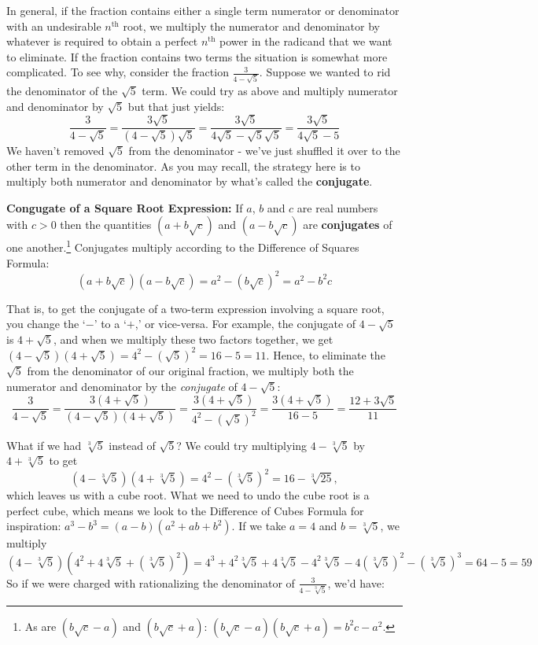 \documentclass[10pt]{article}
\begin{document}
 In general, if the fraction contains either a single term numerator or denominator with an undesirable $n^{\text{th}}$ root, we multiply the numerator and denominator by whatever is required to obtain a perfect $n^{\text{th}}$ power in the radicand that we want to eliminate. If the fraction contains two terms the situation is somewhat more complicated.  To see why, consider the fraction $\frac{3}{4 - \sqrt{5}}$.  Suppose we wanted to rid the denominator of the $\sqrt{5}$ term.  We could try as above and multiply numerator and denominator by $\sqrt{5}$ but that just yields: \[ \dfrac{3}{4 - \sqrt{5}} = \dfrac{3\sqrt{5}}{(4 - \sqrt{5})\sqrt{5}} = \dfrac{3\sqrt{5}}{4\sqrt{5} - \sqrt{5}\sqrt{5}} = \dfrac{3\sqrt{5}}{4\sqrt{5} - 5}\] We haven't removed $\sqrt{5}$ from the denominator - we've just shuffled it over to the other term in the denominator.  As you may recall, the strategy here is to multiply both numerator and denominator by what's called the \textbf{conjugate}.  

\medskip

\colorbox{ResultColor}{\bbm

\begin{defn}\label{squarerootconj} \textbf{Congugate of a Square Root Expression:}  If $a$, $b$ and $c$ are real numbers with $c > 0$ then the quantities $(a + b \sqrt{c})$ and $(a - b\sqrt{c})$ are \textbf{conjugates} of one another.\footnote{As are $(b\sqrt{c} -a)$ and $(b\sqrt{c} + a)$: $(b\sqrt{c} -a)(b\sqrt{c} + a) = b^2c - a^2$.}  Conjugates multiply according to the Difference of Squares Formula:  \[ (a + b \sqrt{c})(a - b\sqrt{c}) = a^2 - (b \sqrt{c})^2 = a^2 - b^2c\]
\end{defn}
\ebm}

\medskip

That is, to get the conjugate of a two-term expression involving a square root, you change the `$-$' to a `$+$,' or vice-versa.  For example, the conjugate of $4 - \sqrt{5}$ is $4 + \sqrt{5}$, and when we multiply these two factors together, we get $(4 - \sqrt{5})(4 + \sqrt{5}) = 4^2 - (\sqrt{5})^2 = 16 - 5 = 11$.  Hence, to eliminate the $\sqrt{5}$ from the denominator of our original fraction, we multiply both the numerator and denominator by the \textit{conjugate} of $4-\sqrt{5}$: \[\dfrac{3}{4 - \sqrt{5}} = \dfrac{3 (4 + \sqrt{5})}{(4 - \sqrt{5})(4 + \sqrt{5})} = \dfrac{3 (4 + \sqrt{5})}{4^2 - (\sqrt{5})^2} = \dfrac{3(4 + \sqrt{5})}{16 - 5} = \dfrac{12 + 3\sqrt{5}}{11}\] 

What if we had $\sqrt[3]{5}$ instead of $\sqrt{5}$?  We could try multiplying $4 - \sqrt[3]{5}$ by $4 + \sqrt[3]{5}$ to get  \[(4 - \sqrt[3]{5})(4 + \sqrt[3]{5}) = 4^2 - (\sqrt[3]{5})^2 = 16 - \sqrt[3]{25},\]
which leaves us with a cube root.  What we need to undo the cube root is a perfect cube, which means we look to the Difference of Cubes Formula for inspiration:  $a^3 - b^3 = (a-b)(a^2+ab+b^2)$.  If we take $a = 4$ and $b = \sqrt[3]{5}$, we multiply \[ (4 - \sqrt[3]{5})(4^2 + 4\sqrt[3]{5} + (\sqrt[3]{5})^2) = 4^3 + 4^2\sqrt[3]{5} + 4 \sqrt[3]{5} - 4^2\sqrt[3]{5}-4(\sqrt[3]{5})^2 - (\sqrt[3]{5})^3 = 64 - 5 = 59\]
So if we were charged with rationalizing the denominator of $\frac{3}{4 - \sqrt[3]{5}}$, we'd have:
\end{document}
